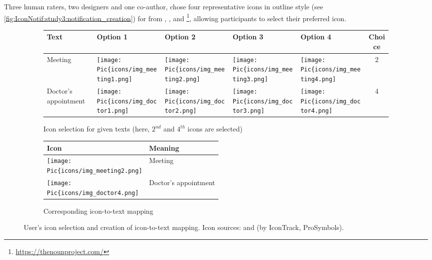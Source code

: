 Three human raters, two designers and one co-author, chose four representative icons in outline style (see \autoref{fig:IconNotif:study3:notification_creation}) for \primaryinfo{} from \materialIcons{}, \flatIcons{}, and \nounProject{}\footnote{\url{https://thenounproject.com/}}, allowing participants to select their preferred icon.

\begin{figure*}[hptb]
\centering

\begin{subfigure}{0.9\textwidth}
  \centering
  \small
    \begin{tabular}{@{}lllllc@{}}
    \toprule
    Text & Option 1 & Option 2 & Option 3 & Option 4 & Choice \\ \midrule
    Meeting &  \texttt{[image: \\Pic\{icons/img\_meeting1.png]}} & \texttt{[image: \\Pic\{icons/img\_meeting2.png]}}  & \texttt{[image: \\Pic\{icons/img\_meeting3.png]}}  & \texttt{[image: \\Pic\{icons/img\_meeting4.png]}}  & 2 \\
    Doctor's appointment & \texttt{[image: \\Pic\{icons/img\_doctor1.png]}}  & \texttt{[image: \\Pic\{icons/img\_doctor2.png]}} & \texttt{[image: \\Pic\{icons/img\_doctor3.png]}} & \texttt{[image: \\Pic\{icons/img\_doctor4.png]}} & 4 \\ \bottomrule
    \end{tabular}
  \caption{Icon selection for given texts (here, $2^{nd}$ and $4^{th}$ icons are selected)}
  \label{fig:IconNotif:study3:user_preference}
\end{subfigure}
\begin{subfigure}{0.9\textwidth}
  \centering
  \small
    \begin{tabular}{@{}ll@{}}
    \toprule
    Icon & Meaning \\ \midrule
    \texttt{[image: \\Pic\{icons/img\_meeting2.png]}}  & Meeting \\
    \texttt{[image: \\Pic\{icons/img\_doctor4.png]}} & Doctor's appointment \\ \bottomrule
    \end{tabular}
  \caption{Corresponding icon-to-text mapping}
  \label{fig:IconNotif:study3:icon_text_mapping}	  
\end{subfigure}

\caption[Icon-to-text mapping process]{User's icon selection and creation of icon-to-text mapping. Icon sources: \flatIcons{} and  \nounProject{} (by IconTrack, ProSymbols).}
\label{fig:IconNotif:study3:notification_creation}
\end{figure*}

